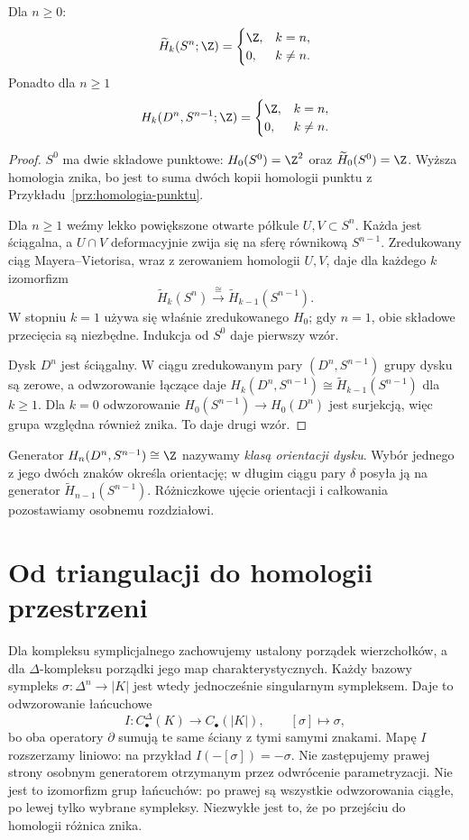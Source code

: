 \begin{twierdzenie}
\label{thm:homologia-sfer}
Dla $n\geq0$:
\[
 \widetilde H_k(S^n;\Z)=
 \begin{cases}\Z,&k=n,\\0,&k\ne n.\end{cases}
\]
Ponadto dla $n\geq1$
\[
 H_k(D^n,S^{n-1};\Z)=
 \begin{cases}\Z,&k=n,\\0,&k\ne n.\end{cases}
\]
\end{twierdzenie}
\begin{proof}
$S^0$ ma dwie składowe punktowe:
$H_0(S^0)=\Z^2$ oraz
$\widetilde H_0(S^0)=\Z$.
Wyższa homologia znika, bo jest
to suma dwóch kopii homologii
punktu z Przykładu~\ref{prz:homologia-punktu}.

Dla $n\geq1$ weźmy lekko
powiększone otwarte półkule
$U,V\subset S^n$. Każda jest
ściągalna, a $U\cap V$
deformacyjnie zwija się na
sferę równikową $S^{n-1}$.
Zredukowany ciąg
Mayera--Vietorisa, wraz z
zerowaniem homologii $U,V$,
daje dla każdego $k$ izomorfizm
\[
 \widetilde H_k(S^n)
 \xrightarrow{\ \cong\ }
 \widetilde H_{k-1}(S^{n-1}).
\]
W stopniu $k=1$ używa się
właśnie zredukowanego $H_0$;
gdy $n=1$, obie składowe
przecięcia są niezbędne.
Indukcja od $S^0$ daje pierwszy wzór.

Dysk $D^n$ jest ściągalny. W ciągu
zredukowanym pary $(D^n,S^{n-1})$
grupy dysku są zerowe, a odwzorowanie
łączące daje
$H_k(D^n,S^{n-1})\cong
\widetilde H_{k-1}(S^{n-1})$
dla $k\geq1$. Dla $k=0$
odwzorowanie $H_0(S^{n-1})\to H_0(D^n)$
jest surjekcją, więc grupa
względna również znika.
To daje drugi wzór.
\end{proof}

\begin{uwaga}
Generator $H_n(D^n,S^{n-1})\cong\Z$
nazywamy \emph{klasą orientacji dysku}.
Wybór jednego z jego dwóch znaków
określa orientację; w długim ciągu
pary $\delta$ posyła ją na
generator $\widetilde H_{n-1}(S^{n-1})$.
Różniczkowe ujęcie orientacji
i całkowania pozostawiamy
osobnemu rozdziałowi.
\end{uwaga}

\section{Od triangulacji do homologii przestrzeni}
\label{sec:porownanie-symplicjalne}

Dla kompleksu symplicjalnego zachowujemy ustalony porządek
wierzchołków, a dla $\Delta$-kompleksu porządki jego map charakterystycznych.
Każdy bazowy sympleks $\sigma:\Delta^n\to|K|$ jest wtedy
jednocześnie singularnym sympleksem. Daje to odwzorowanie łańcuchowe
\[
 I:C_\bullet^\Delta(K)\longrightarrow C_\bullet(|K|),
 \qquad [\sigma]\longmapsto \sigma,
\]
bo oba operatory $\partial$ sumują te same
ściany z tymi samymi znakami.
Mapę $I$ rozszerzamy liniowo: na przykład $I(-[\sigma])=-\sigma$.
Nie zastępujemy prawej strony osobnym generatorem otrzymanym
przez odwrócenie parametryzacji. Nie jest to
izomorfizm grup łańcuchów: po prawej są
wszystkie odwzorowania ciągłe, po lewej tylko
wybrane sympleksy. Niezwykłe jest to,
że po przejściu do homologii różnica znika.

